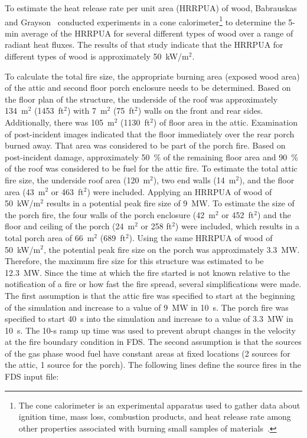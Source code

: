 To estimate the heat release rate per unit area (HRRPUA) of wood, Babrauskas and Grayson~\cite{babrauskas1990} conducted experiments in a cone calorimeter\footnote{The cone calorimeter is an experimental apparatus used to gather data about ignition time, mass loss, combustion products, and heat release rate among other properties associated with burning small samples of materials~\cite{ASTM:E1355}.} to determine the 5-min average of the HRRPUA for several different types of wood over a range of radiant heat fluxes. The results of that study indicate that the HRRPUA for different types of wood is approximately 50~kW/m$^2$.

To calculate the total fire size, the appropriate burning area (exposed wood area) of the attic and second floor porch enclosure needs to be determined. Based on the floor plan of the structure, the underside of the roof was approximately 134~m$^2$ (1453~ft$^2$) with 7~m$^2$ (75~ft$^2$) walls on the front and rear sides. Additionally, there was 105~m$^2$ (1130~ft$^2$) of floor area in the attic. Examination of post-incident images indicated that the floor immediately over the rear porch burned away. That area was considered to be part of the porch fire. Based on post-incident damage, approximately 50~\% of the remaining floor area and 90~\% of the roof was considered to be fuel for the attic fire. To estimate the total attic fire size, the underside roof area (120~m$^2$), two end walls (14~m$^2$), and the floor area (43~m$^2$ or 463~ft$^2$) were included. Applying an HRRPUA of wood of 50~kW/m$^2$ results in a potential peak fire size of 9~MW. To estimate the size of the porch fire, the four walls of the porch enclosure (42~m$^2$ or 452~ft$^2$) and the floor and ceiling of the porch (24~m$^2$ or 258 ft$^2$) were included, which results in a total porch area of 66~m$^2$ (689~ft$^2$). Using the same HRRPUA of wood of 50~kW/m$^2$, the potential peak fire size on the porch was approximately 3.3~MW. Therefore, the maximum fire size for this structure was estimated to be 12.3~MW. Since the time at which the fire started is not known relative to the notification of a fire or how fast the fire spread, several simplifications were made. The first assumption is that the attic fire was specified to start at the beginning of the simulation and increase to a value of 9~MW in 10~s. The porch fire was specified to start 40~s into the simulation and increase to a value of 3.3~MW in 10~s. The 10-s ramp up time was used to prevent abrupt changes in the velocity at the fire boundary condition in FDS. The second assumption is that the sources of the gas phase wood fuel have constant areas at fixed locations (2 sources for the attic, 1 source for the porch). The following lines define the source fires in the FDS input file:

